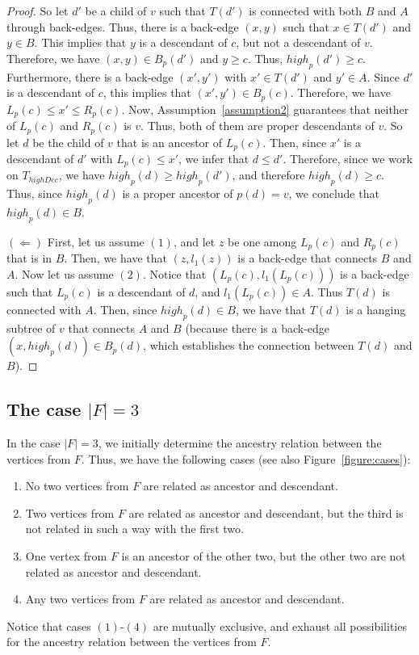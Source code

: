 \documentclass[11pt,a4paper]{article}
\begin{document}
\begin{proof}
So let $d'$ be a child of $v$ such that $T(d')$ is connected with both $B$ and $A$ through back-edges. Thus, there is a back-edge $(x,y)$ such that $x\in T(d')$ and $y\in B$. This implies that $y$ is a descendant of $c$, but not a descendant of $v$. Therefore, we have $(x,y)\in B_p(d')$ and $y\geq c$. Thus, $\mathit{high}_p(d')\geq c$. Furthermore, there is a back-edge $(x',y')$ with $x'\in T(d')$ and $y'\in A$. Since $d'$ is a descendant of $c$, this implies that $(x',y')\in B_p(c)$. Therefore, we have $L_p(c)\leq x'\leq R_p(c)$. Now, Assumption~\ref{assumption2} guarantees that neither of $L_p(c)$ and $R_p(c)$ is $v$. Thus, both of them are proper descendants of $v$. So let $d$ be the child of $v$ that is an ancestor of $L_p(c)$. Then, since $x'$ is a descendant of $d'$ with $L_p(c)\leq x'$, we infer that $d\leq d'$. Therefore, since we work on $T_\mathit{highDec}$, we have $\mathit{high}_p(d)\geq\mathit{high}_p(d')$, and therefore $\mathit{high}_p(d)\geq c$. Thus, since $\mathit{high}_p(d)$ is a proper ancestor of $p(d)=v$, we conclude that $\mathit{high}_p(d)\in B$.









$(\Leftarrow)$ First, let us assume $(1)$, and let $z$ be one among $L_p(c)$ and $R_p(c)$ that is in $B$. Then, we have that $(z,l_1(z))$ is a back-edge that connects $B$ and $A$. Now let us assume $(2)$. Notice that $(L_p(c),l_1(L_p(c)))$ is a back-edge such that $L_p(c)$ is a descendant of $d$, and $l_1(L_p(c))\in A$. Thus $T(d)$ is connected with $A$. Then, since $\mathit{high}_p(d)\in B$, we have that $T(d)$ is a hanging subtree of $v$ that connects $A$ and $B$ (because there is a back-edge $(x,\mathit{high}_p(d))\in B_p(d)$, which establishes the connection between $T(d)$ and $B$).
\end{proof}


\subsection{The case $|F|=3$}
\label{section:f=3}

In the case $|F|=3$, we initially determine the ancestry relation between the vertices from $F$. Thus, we have the following cases (see also Figure~\ref{figure:cases}):

\begin{enumerate}[label={(\arabic*)}] 
\item{No two vertices from $F$ are related as ancestor and descendant.}
\item{Two vertices from $F$ are related as ancestor and descendant, but the third is not related in such a way with the first two.}
\item{One vertex from $F$ is an ancestor of the other two, but the other two are not related as ancestor and descendant.}
\item{Any two vertices from $F$ are related as ancestor and descendant.}
\end{enumerate}
Notice that cases $(1)$-$(4)$ are mutually exclusive, and exhaust all possibilities for the ancestry relation between the vertices from $F$. 
\end{document}
